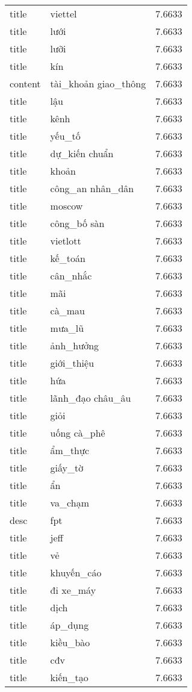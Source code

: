 \documentclass{article}
\begin{document}
\begin{tabular}{lll}
title & viettel & 7.6633\\
title & lưới & 7.6633\\
title & lưỡi & 7.6633\\
title & kín & 7.6633\\
content & tài\_khoản giao\_thông & 7.6633\\
title & lậu & 7.6633\\
title & kênh & 7.6633\\
title & yếu\_tố & 7.6633\\
title & dự\_kiến chuẩn & 7.6633\\
title & khoản & 7.6633\\
title & công\_an nhân\_dân & 7.6633\\
title & moscow & 7.6633\\
title & công\_bố sàn & 7.6633\\
title & vietlott & 7.6633\\
title & kế\_toán & 7.6633\\
title & cân\_nhắc & 7.6633\\
title & mãi & 7.6633\\
title & cà\_mau & 7.6633\\
title & mưa\_lũ & 7.6633\\
title & ảnh\_hưởng & 7.6633\\
title & giới\_thiệu & 7.6633\\
title & hứa & 7.6633\\
title & lãnh\_đạo châu\_âu & 7.6633\\
title & giỏi & 7.6633\\
title & uống cà\_phê & 7.6633\\
title & ẩm\_thực & 7.6633\\
title & giấy\_tờ & 7.6633\\
title & ẩn & 7.6633\\
title & va\_chạm & 7.6633\\
desc & fpt & 7.6633\\
title & jeff & 7.6633\\
title & vẻ & 7.6633\\
title & khuyến\_cáo & 7.6633\\
title & đi xe\_máy & 7.6633\\
title & dịch & 7.6633\\
title & áp\_dụng & 7.6633\\
title & kiều\_bào & 7.6633\\
title & cđv & 7.6633\\
title & kiến\_tạo & 7.6633\\

\end{tabular}
\end{document}

